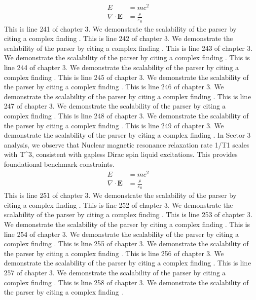 \begin{align*}
  E &= mc^2 \\
  \nabla \cdot \mathbf{E} &= \frac{\rho}{\varepsilon_0}
\end{align*}
This is line 241 of chapter 3. We demonstrate the scalability of the parser by citing a complex finding \cite{ref3_241}.
This is line 242 of chapter 3. We demonstrate the scalability of the parser by citing a complex finding \cite{ref3_242}.
This is line 243 of chapter 3. We demonstrate the scalability of the parser by citing a complex finding \cite{ref3_243}.
This is line 244 of chapter 3. We demonstrate the scalability of the parser by citing a complex finding \cite{ref3_244}.
This is line 245 of chapter 3. We demonstrate the scalability of the parser by citing a complex finding \cite{ref3_245}.
This is line 246 of chapter 3. We demonstrate the scalability of the parser by citing a complex finding \cite{ref3_246}.
This is line 247 of chapter 3. We demonstrate the scalability of the parser by citing a complex finding \cite{ref3_247}.
This is line 248 of chapter 3. We demonstrate the scalability of the parser by citing a complex finding \cite{ref3_248}.
This is line 249 of chapter 3. We demonstrate the scalability of the parser by citing a complex finding \cite{ref3_249}.
In Sector 3 analysis, we observe that Nuclear magnetic resonance relaxation rate 1/T1 scales with T^3, consistent with gapless Dirac spin liquid excitations. This provides foundational benchmark constraints.
\begin{align*}
  E &= mc^2 \\
  \nabla \cdot \mathbf{E} &= \frac{\rho}{\varepsilon_0}
\end{align*}
This is line 251 of chapter 3. We demonstrate the scalability of the parser by citing a complex finding \cite{ref3_251}.
This is line 252 of chapter 3. We demonstrate the scalability of the parser by citing a complex finding \cite{ref3_252}.
This is line 253 of chapter 3. We demonstrate the scalability of the parser by citing a complex finding \cite{ref3_253}.
This is line 254 of chapter 3. We demonstrate the scalability of the parser by citing a complex finding \cite{ref3_254}.
This is line 255 of chapter 3. We demonstrate the scalability of the parser by citing a complex finding \cite{ref3_255}.
This is line 256 of chapter 3. We demonstrate the scalability of the parser by citing a complex finding \cite{ref3_256}.
This is line 257 of chapter 3. We demonstrate the scalability of the parser by citing a complex finding \cite{ref3_257}.
This is line 258 of chapter 3. We demonstrate the scalability of the parser by citing a complex finding \cite{ref3_258}.
